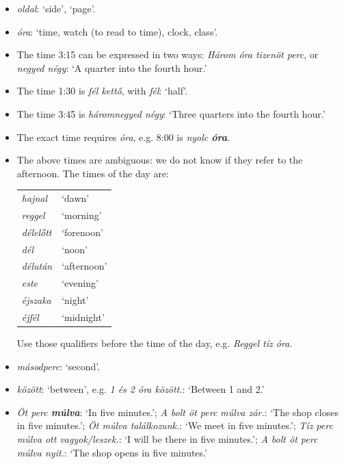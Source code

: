 \documentclass[a4paper,11pt]{article}
\begin{document}
\begin{itemize}
  \item \emph{oldal}: `side', `page'.

  \item \emph{óra}: `time, watch (to read to time), clock, class'.

  \item The time 3:15 can be expressed in two ways: \emph{Három óra
  tizenöt perc}, or \emph{negyed négy}: `A quarter into the fourth
    hour.'

  \item The time 1:30 is \emph{fél kettő}, with \emph{fél}: `half'.

  \item The time 3:45 is \emph{háromnegyed négy}: `Three quarters into
    the fourth hour.'

  \item The exact time requires \emph{óra}, e.g. 8:00 is \emph{nyolc
  \textbf{óra}}.

  \item The above times are ambiguous: we do not know if they refer to
    the afternoon. The times of the day are:
    \begin{center}
      \begin{tabular}{>{\itshape}ll}
        hajnal   & `dawn' \\
        reggel   & `morning' \\
        délelőtt & `forenoon' \\
        dél      & `noon' \\
        délután  & `afternoon' \\
        este     & `evening' \\
        éjszaka  & `night' \\
        éjfél    & `midnight'
      \end{tabular}
    \end{center}
    Use those qualifiers before the time of the day, e.g. \emph{Reggel
    tíz óra.}

  \item \emph{másodperc}: `second'.

  \item \emph{között}: `between', e.g. \emph{1 és 2 óra között.}:
    `Between 1 and 2.'

  \item \emph{Öt perc \textbf{múlva}}: `In five minutes.'; \emph{A
  bolt öt perc múlva zár.}: `The shop closes in five minutes.';
    \emph{Öt múlva találkozunk.}: `We meet in five minutes.';
    \emph{Tíz perc múlva ott vagyok/leszek.}: `I will be there in five
    minutes.'; \emph{A bolt öt perc múlva nyit.}: `The shop opens in
    five minutes.'


\end{itemize}
\end{document}
